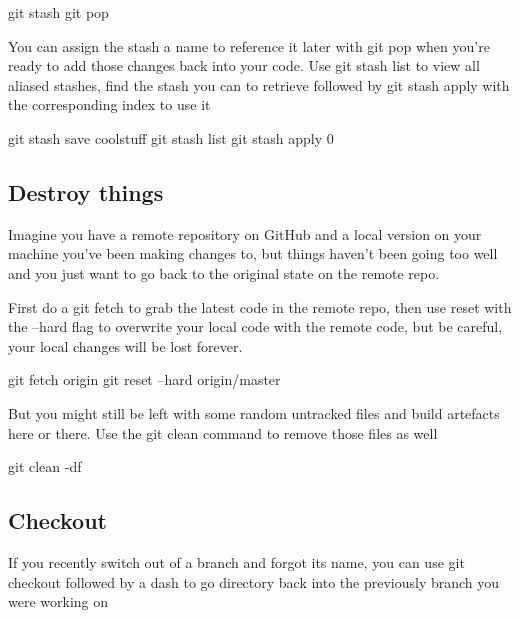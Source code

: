\begin{git-bash}
    git stash
    git pop
\end{git-bash}

You can assign the stash a name to reference it later with git pop when you're ready to add those changes back into your code. Use git stash list to view all aliased stashes, find the stash you can to retrieve followed by git stash apply with the corresponding index to use it

\begin{git-bash}
    git stash save coolstuff
    git stash list
    git stash apply 0
\end{git-bash}



\subsection{Destroy things}

Imagine you have a remote repository on GitHub and a local version on your machine you've been making changes to, but things haven't been going too well and you just want to go back to the original state on the remote repo.

First do a git fetch to grab the latest code in the remote repo, then use reset with the --hard flag to overwrite your local code with the remote code, but be careful, your local changes will be lost forever.

\begin{git-bash}
    git fetch origin
    git reset --hard origin/master
\end{git-bash}

But you might still be left with some random untracked files and build artefacts here or there. Use the git clean command to remove those files as well

\begin{git-bash}
    git clean -df
\end{git-bash}



\subsection{Checkout}

If you recently switch out of a branch and forgot its name, you can use git checkout followed by a dash to go directory back into the previously branch you were working on

